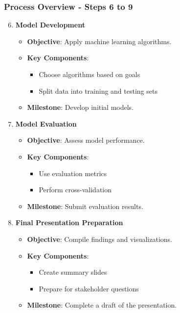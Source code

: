 \documentclass[aspectratio=169]{beamer}
\begin{document}
\begin{frame}[fragile]
  \frametitle{Process Overview - Steps 6 to 9}
  \begin{enumerate}
    \setcounter{enumi}{5}
    \item \textbf{Model Development}
      \begin{itemize}
        \item \textbf{Objective}: Apply machine learning algorithms.
        \item \textbf{Key Components}:
          \begin{itemize}
            \item Choose algorithms based on goals
            \item Split data into training and testing sets
          \end{itemize}
        \item \textbf{Milestone}: Develop initial models.
      \end{itemize}

    \item \textbf{Model Evaluation}
      \begin{itemize}
        \item \textbf{Objective}: Assess model performance.
        \item \textbf{Key Components}:
          \begin{itemize}
            \item Use evaluation metrics
            \item Perform cross-validation
          \end{itemize}
        \item \textbf{Milestone}: Submit evaluation results.
      \end{itemize}

    \item \textbf{Final Presentation Preparation}
      \begin{itemize}
        \item \textbf{Objective}: Compile findings and visualizations.
        \item \textbf{Key Components}:
          \begin{itemize}
            \item Create summary slides
            \item Prepare for stakeholder questions
          \end{itemize}
        \item \textbf{Milestone}: Complete a draft of the presentation.
      \end{itemize}


\end{enumerate}
\end{frame}
\end{document}

